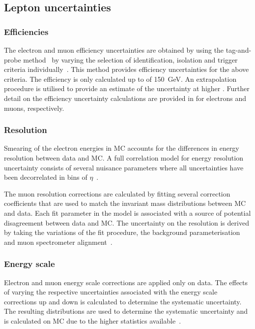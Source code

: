 \subsection{Lepton uncertainties}

\subsubsection{Efficiencies}
The electron and muon efficiency uncertainties are obtained by using the tag-and-probe method~\cite{Aaboud:2016vfy,Aad:2016jkr} by varying the selection of identification, isolation and trigger criteria individually~\cite{Aad:2019tso,Aad:2016jkr}. This method provides efficiency uncertainties for the above criteria.  The efficiency is only calculated up to \et of \SI{150}{\giga\electronvolt}. An extrapolation procedure is utilised to provide an estimate of the uncertainty at higher \et. Further detail on the efficiency uncertainty calculations are provided in \cite{Aad:2019tso,Aad:2016jkr} for electrons and muons, respectively. 

\subsubsection{Resolution}
Smearing of the electron energies in MC accounts for the differences in energy resolution between data and MC. A full correlation model for energy resolution uncertainty consists of several nuisance parameters where all uncertainties have been decorrelated in bins of $\eta$~\cite{Aad:2019tso}.

The muon resolution corrections are calculated by fitting several correction coefficients that are used to match the invariant mass distributions between MC and data. Each fit parameter in the model is associated with a source of potential disagreement between data and MC. The uncertainty on the resolution is derived by taking the variations of the fit procedure, the background parameterisation and muon spectrometer alignment~\cite{Aad:2016jkr}. 

\subsubsection{Energy scale}
Electron and muon energy scale corrections are applied only on data. The effects of varying the respective uncertainties associated with the energy scale corrections up and down is calculated to determine the systematic uncertainty. The resulting distributions are used to determine the systematic uncertainty and is calculated on MC due to the higher statistics available~\cite{Aad:2019tso}. 

